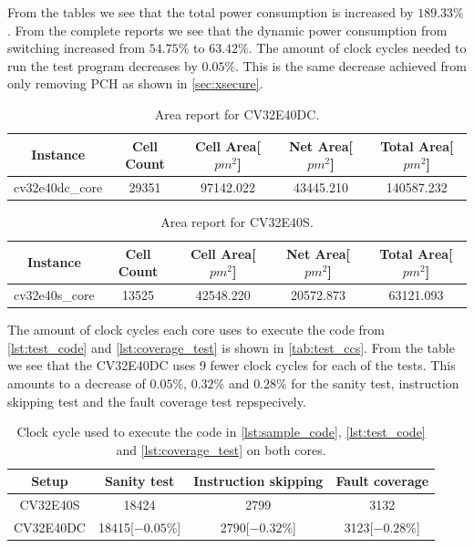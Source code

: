 From the tables we see that the total power consumption is increased by $189.33\%$.  From the complete reports we see that the dynamic power consumption from switching increased from $54.75\%$ to $63.42\%$. The amount of clock cycles needed to run the test program decreases by $0.05\%$. This is the same decrease achieved from only removing PCH as shown in \autoref{sec:xsecure}.

\begin{table}[h!]
\centering
\caption{Area report for CV32E40DC.}
\label{tab:cv32e40dc_area}
\begin{tabular}{c|cccc}
\toprule 
Instance & Cell Count & Cell Area[$pm^2$] & Net Area[$pm^2$] & Total Area[$pm^2$]\\
\midrule
\rowcolor{black!20} cv32e40dc\_core & 29351 & 97142.022 & 43445.210 & 140587.232\\
\bottomrule
\end{tabular}
\end{table}

\begin{table}[h!]
\centering
\caption{Area report for CV32E40S.}
\label{tab:cv32e40s_area}
\begin{tabular}{c|cccc}
\toprule 
Instance & Cell Count & Cell Area[$pm^2$] & Net Area[$pm^2$] & Total Area[$pm^2$]\\
\midrule
\rowcolor{black!20} cv32e40s\_core & 13525 & 42548.220 & 20572.873 & 63121.093\\
\bottomrule
\end{tabular}
\end{table}

The amount of clock cycles each core uses to execute the code from \autoref{lst:test_code} and \autoref{lst:coverage_test} is shown in \autoref{tab:test_ccs}. From the table we see that the CV32E40DC uses 9 fewer clock cycles for each of the tests. This amounts to a decrease of $0.05\%$, $0.32\%$ and $0.28\%$ for the sanity test, instruction skipping test and the fault coverage test repspecively. 

\begin{table}[h]
\centering
\caption{Clock cycle used to execute the code in \autoref{lst:sample_code}, \autoref{lst:test_code} and \autoref{lst:coverage_test} on both cores.}
\label{tab:test_ccs}
\begin{tabular}{c|ccc}
\toprule 
Setup & Sanity test & Instruction skipping & Fault coverage \\
\midrule
\rowcolor{black!20} CV32E40S & 18424 & 2799 & 3132\\
CV32E40DC & 18415[$-0.05\%$] & 2790[$-0.32\%$] & 3123[$-0.28\%$]\\
\bottomrule
\end{tabular}
\end{table}

